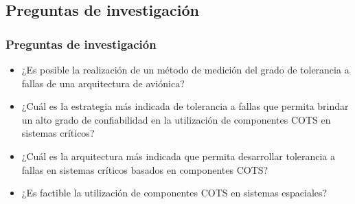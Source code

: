 \subsection{Preguntas de investigación}
\begin{frame}
	\frametitle{Preguntas de investigación}
	\begin{itemize}
		\item ¿Es posible la realización de un método de medición del grado de tolerancia a fallas de una arquitectura de aviónica?
		\item ¿Cuál es la estrategia más indicada de tolerancia a fallas que permita brindar un alto grado de confiabilidad en la utilización de componentes COTS en sistemas críticos?
		\item ¿Cuál es la arquitectura más indicada que permita desarrollar tolerancia a fallas en sistemas críticos basados en componentes COTS?
		\item ¿Es factible la utilización de componentes COTS en sistemas espaciales?
	\end{itemize}
\end{frame}